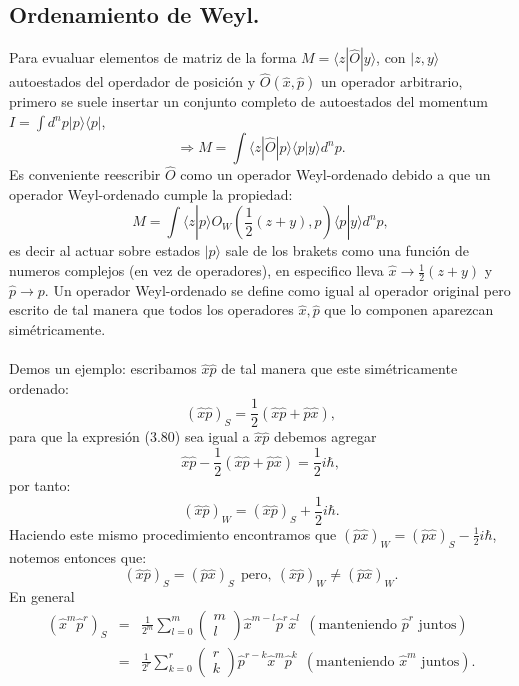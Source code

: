 \subsection{Ordenamiento de Weyl.}
Para evualuar elementos de matriz de la forma $M=\langle z|\hat{O}|y\rangle$, con $|z,y\rangle $ autoestados del operdador de posición y $\hat{O}(\hat{x},\hat{p})$ un operador arbitrario, primero se suele insertar un conjunto completo de autoestados del momentum $I=\int d^np|p\rangle\langle p|$,
\begin{equation}
\Rightarrow M=\int\langle z|\hat{O}|p\rangle\langle p|y\rangle d^{n}p.
\end{equation}
Es conveniente reescribir $\hat{O}$ como un operador Weyl-ordenado debido a que un operador Weyl-ordenado cumple la propiedad:
\begin{equation}
M=\int\langle z|p\rangle O_{W}\left(\frac{1}{2}(z+y),p\right)\langle p|y\rangle d^{n}p,
\end{equation}
es decir al actuar sobre estados $|p\rangle$ sale de los brakets como una función de numeros complejos (en vez de operadores), en especifico lleva $\hat{x}\to \frac{1}{2}(z+y)$ y $\hat{p}\to p$. Un operador Weyl-ordenado se define como igual al operador original pero escrito de tal manera que todos los operadores $\hat{x},\hat{p}$ que lo componen aparezcan simétricamente. 
\\
\\
Demos un ejemplo: escribamos $\hat{x}\hat{p}$ de tal manera que este simétricamente ordenado:
\begin{equation}
(\hat{x}\hat{p})_S=\frac{1}{2}(\hat{x}\hat{p}+\hat{p}\hat{x}),
\end{equation}
para que la expresión (3.80) sea igual a $\hat{x}\hat{p}$ debemos agregar
\begin{equation}
\hat{x}\hat{p}-\frac{1}{2}(\hat{x}\hat{p}+\hat{p}\hat{x})=\frac{1}{2}i\hbar ,
\end{equation}
por tanto:
\begin{equation}
(\hat{x}\hat{p})_W=(\hat{x}\hat{p})_S+\frac{1}{2}i\hbar .
\end{equation}
Haciendo este mismo procedimiento encontramos que $(\hat{p}\hat{x})_W=(\hat{p}\hat{x})_S-\frac{1}{2}i\hbar$, notemos entonces que:
\begin{equation}
(\hat{x}\hat{p})_S=(\hat{p}\hat{x})_S \ \ \text{pero},\ (\hat{x}\hat{p})_W\neq(\hat{p}\hat{x})_W. 
\end{equation}
En general
\begin{eqnarray}
\nonumber (\hat{x}^{m}\hat{p}^{r})_{S}&=&\frac{1}{2^{m}}\sum_{l=0}^{m}\left(\begin{array}{c}
m\\
l
\end{array}\right)\hat{x}^{m-l}\hat{p}^{r}\hat{x}^{l}\ \ (\text{manteniendo $\hat{p}^r$ juntos})\\
&=& \frac{1}{2^{r}}\sum_{k=0}^{r}\left(\begin{array}{c}
r\\
k
\end{array}\right)\hat{p}^{r-k}\hat{x}^{m}\hat{p}^{k} \ \ (\text{manteniendo $\hat{x}^m$ juntos}).
\end{eqnarray}
